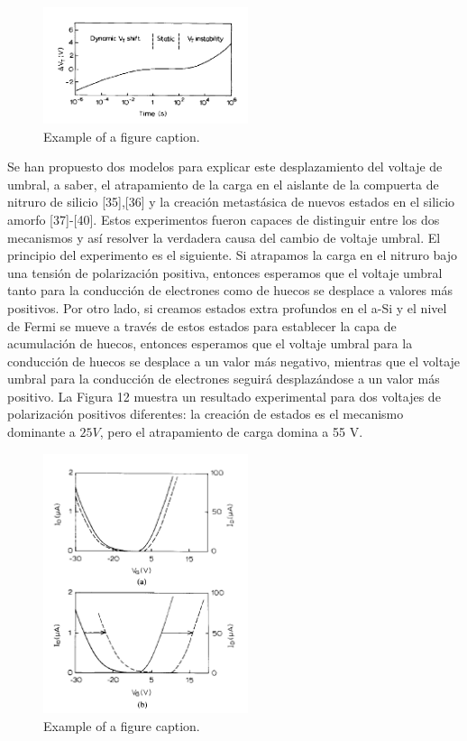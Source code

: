 \documentclass[conference]{IEEEtran}
\begin{document}
\begin{figure}[htbp]
    \centerline{\includegraphics[width=6.0cm]{img/imagen-11.png}}
    \caption{Example of a figure caption.}%
    \label{fig11}
\end{figure} 

    Se han propuesto dos modelos para explicar este desplazamiento del voltaje de umbral, a saber, 
    el atrapamiento de la carga en el aislante de la compuerta de nitruro de silicio [35],[36] 
    y la creación metastásica de nuevos estados en el silicio amorfo [37]-[40]. Estos experimentos 
    fueron capaces de distinguir entre los dos mecanismos y así resolver la verdadera causa del 
    cambio de voltaje umbral. El principio del experimento es el siguiente. Si atrapamos la carga 
    en el nitruro bajo una tensión de polarización positiva, entonces esperamos que el voltaje 
    umbral tanto para la conducción de electrones como de huecos se desplace a valores más positivos. 
    Por otro lado, si creamos estados extra profundos en el a-Si y el nivel de Fermi se mueve a través
    de estos estados para establecer la capa de acumulación de huecos, entonces esperamos que el 
    voltaje umbral para la conducción de huecos se desplace a un valor más negativo, mientras que el 
    voltaje umbral para la conducción de electrones seguirá desplazándose a un valor más positivo. 
    La Figura 12 muestra un resultado experimental para dos voltajes de polarización positivos 
    diferentes: la creación de estados es el mecanismo dominante a $25 V$, pero el atrapamiento de 
    carga domina a 55 V.

\begin{figure}[htbp]
    \centerline{\includegraphics[width=6.0cm]{img/imagen-12.png}}
    \caption{Example of a figure caption.}%
    \label{fig12}
\end{figure} 
    
\end{document}
